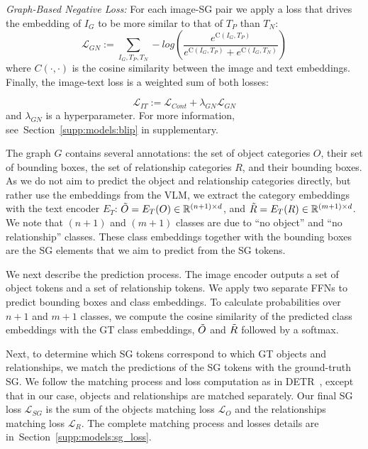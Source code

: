 \documentclass[11pt]{article}
\def\Secref#1{Section~\ref{#1}}
\newcommand{\Ig}{I_G}
\newcommand{\minisection}[1]{\noindent{\textbf{#1}.}}
\def\Secref#1{Section~\ref{#1}}
\begin{document}
\noindent\textit{Graph-Based Negative Loss:} 
For each image-SG pair we apply a loss that drives the embedding of $\Ig$ to be more similar to that of $T_P$ than $T_N$:
$$\mathcal{L}_{GN} := \sum_{\Ig,T_P,T_N} -log\left(\frac{e^{\text{C}(\Ig,T_P)}}{e^{\text{C}(\Ig,T_P)} +e^{\text{C}(\Ig,T_N)}}\right)
$$
where ${C}(\cdot,\cdot)$ is the cosine similarity between the image and text embeddings. Finally, the image-text loss is a weighted sum of both losses: 


\begin{equation}
\label{eq:it}
\mathcal{L}_{IT} := \mathcal{L}_{Cont} + \lambda_{GN}\mathcal{L}_{GN}
\end{equation}
and $\lambda_{GN}$ is a hyperparameter. For more information, see~\Secref{supp:models:blip} in supplementary.






\minisection{Scene Graph Loss}
The graph $G$ contains several annotations: the set of object categories $O$, their set of bounding boxes, the set of relationship categories $R$, and their bounding boxes. As we do not aim to predict the object and relationship categories directly, but rather use the embeddings from the VLM, we extract the category embeddings with the text encoder $E_T$: $\Tilde{O} = E_T(O) \in \mathbb{R}^{(n+1) \times d}$, and $\Tilde{R} = E_T(R) \in \mathbb{R}^{(m+1) \times d}$. We note that $(n+1)$ and $(m+1)$ classes are due to ``no object'' and ``no relationship'' classes. These class embeddings together with the bounding boxes are the SG elements that we aim to predict from the SG tokens.

We next describe the prediction process. The image encoder outputs a set of object tokens and a set of relationship tokens. We apply two separate FFNs to predict bounding boxes and class embeddings. To calculate probabilities over $n + 1$ and $m + 1$ classes, we compute the cosine similarity of the predicted class embeddings with the GT class embeddings,  $\Tilde{O}$ and $\Tilde{R}$ followed by a softmax.














Next, to determine which SG tokens correspond to which GT objects and relationships, we match the predictions of the SG tokens with the ground-truth SG. We follow the matching process and loss computation as in DETR~\cite{detr2020}, except that in our case, objects and relationships are matched separately. Our final SG loss $\mathcal{L}_{SG}$ is the sum of the objects matching loss $\mathcal{L}_{O}$ and the relationships matching loss $\mathcal{L}_{R}$. The complete matching process and losses details are in~\Secref{supp:models:sg_loss}.
\end{document}
